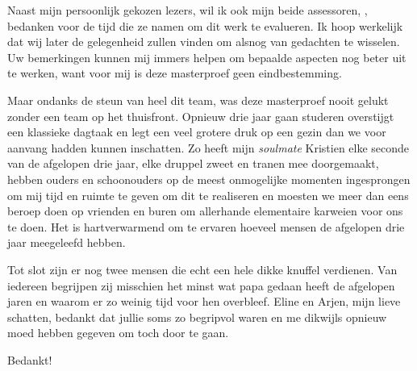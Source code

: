 \begin{preface}
Naast mijn persoonlijk gekozen lezers, wil ik ook mijn beide assessoren, \TODO,
bedanken voor de tijd die ze namen om dit werk te evalueren. Ik hoop werkelijk
dat wij later de gelegenheid zullen vinden om alsnog van gedachten te wisselen.
Uw bemerkingen kunnen mij immers helpen om bepaalde aspecten nog beter uit te
werken, want voor mij is deze masterproef geen eindbestemming.

Maar ondanks de steun van heel dit team, was deze masterproef nooit gelukt
zonder een team op het thuisfront. Opnieuw drie jaar gaan studeren overstijgt
een klassieke dagtaak en legt een veel grotere druk op een gezin dan we voor
aanvang hadden kunnen inschatten. Zo heeft mijn \emph{soulmate} Kristien elke
seconde van de afgelopen drie jaar, elke druppel zweet en tranen mee
doorgemaakt, hebben ouders en schoonouders op de meest onmogelijke momenten
ingesprongen om mij tijd en ruimte te geven om dit te realiseren en moesten we
meer dan eens beroep doen op vrienden en buren om allerhande elementaire
karweien voor ons te doen. Het is hartverwarmend om te ervaren hoeveel mensen
de afgelopen drie jaar meegeleefd hebben.

Tot slot zijn er nog twee mensen die echt een hele dikke knuffel verdienen. Van
iedereen begrijpen zij misschien het minst wat papa gedaan heeft de afgelopen
jaren en waarom er zo weinig tijd voor hen overbleef. Eline en Arjen, mijn
lieve schatten, bedankt dat jullie soms zo begripvol waren en me dikwijls
opnieuw moed hebben gegeven om toch door te gaan.

\bigskip

Bedankt!

\end{preface}

